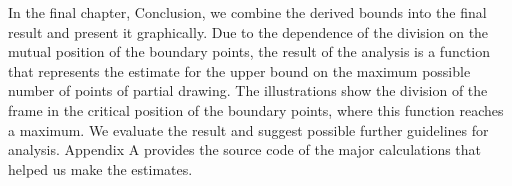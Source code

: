 In the final chapter, Conclusion, we combine the derived bounds into the final result and present it graphically. Due to the dependence of the division on the mutual position of the boundary points, the result of the analysis is a function that represents the estimate for the upper bound on the maximum possible number of points of partial drawing. The illustrations show the division of the frame in the critical position of the boundary points, where this function reaches a maximum. We evaluate the result and suggest possible further guidelines for analysis. Appendix A provides the source code of the major calculations that helped us make the estimates.

